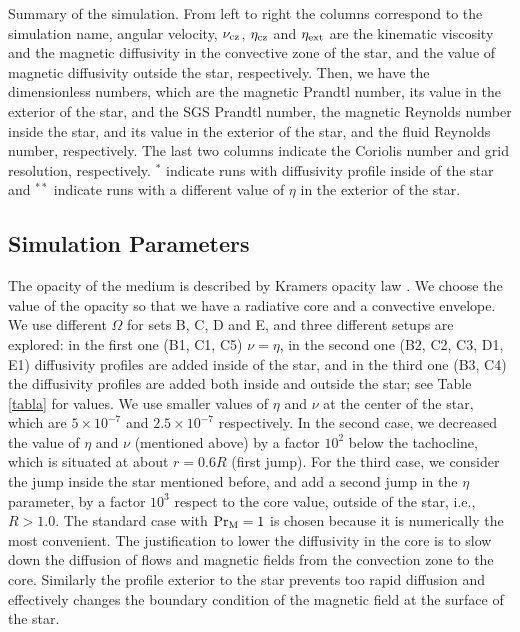 \documentclass[baaa]{baaa}
\begin{document}
\begin{table*}[t!]
    \caption{Summary of the simulation. From left to right the columns correspond to the simulation name, angular velocity, $\nu_{\rm cz}$, $\eta_{\rm cz}$ and $\eta_{\rm ext}$ are the kinematic viscosity and the magnetic diffusivity in the convective zone of the star, and the value of magnetic diffusivity outside the star, respectively. Then, we have the dimensionless numbers, which are the magnetic Prandtl number, its value in the exterior of the star, and the SGS Prandtl number, the magnetic Reynolds number inside the star, and its value in the exterior of the star, and the fluid Reynolds number, respectively. The last two columns indicate the Coriolis number and grid resolution, respectively. $^*$ indicate runs with diffusivity profile inside of the star and $^{**}$ indicate runs with a different value of $\eta$ in the exterior of the star.}
    \label{tabla}
\end{table*}




\subsection{Simulation Parameters}

The opacity of the medium is described by Kramers opacity law \citep{kramerley}. We choose the value of the opacity so that we have a radiative core and a convective envelope. We use different $\Omega$ for sets B, C, D and E, and three different setups are explored: in the first one (B1, C1, C5) $\nu = \eta$, in the second one (B2, C2, C3, D1, E1) diffusivity profiles are added inside of the star, and in the third one (B3, C4) the diffusivity profiles are added both inside and outside the star; see Table \ref{tabla} for values.
We use 
smaller values of $\eta$ and $\nu$ at the center of the star, which are $5\times 10^{-7}$ and $2.5\times 10^{-7}$ respectively. In the second case, we decreased the value of $\eta$ and $\nu$ (mentioned above) by a factor $10^{2}$ below the tachocline, which is situated at about $r = 0.6 R$ (first jump). For the third case, we consider the jump inside the star mentioned before, and add a second jump in the $\eta$ parameter, by a factor $10^{3}$ respect to the core value, outside of the star, i.e., $R > 1.0$. 
The standard case with ${\rm Pr}_{\rm M} =1$ is chosen because it is numerically the most convenient. The justification to lower the diffusivity in the core is to slow down the diffusion of flows and magnetic fields from the convection zone to the core. Similarly the profile exterior to the star prevents too rapid diffusion and effectively changes the boundary condition of the magnetic field at the surface of the star.
\end{document}
